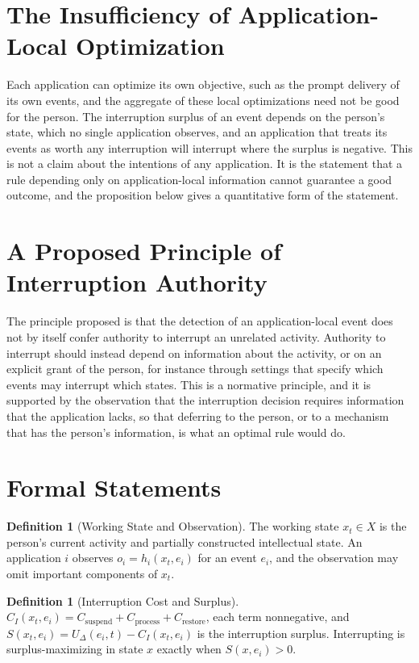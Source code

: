 \documentclass[11pt,letterpaper]{report}
\theoremstyle{plain}
\theoremstyle{definition}
\newtheorem{definition}[theorem]{Definition}
\theoremstyle{remark}
\begin{document}
\section{The Insufficiency of Application-Local Optimization}

Each application can optimize its own objective, such as the prompt delivery of its own events, and the aggregate of these local optimizations need not be good for the person. The interruption surplus of an event depends on the person's state, which no single application observes, and an application that treats its events as worth any interruption will interrupt where the surplus is negative. This is not a claim about the intentions of any application. It is the statement that a rule depending only on application-local information cannot guarantee a good outcome, and the proposition below gives a quantitative form of the statement.

\section{A Proposed Principle of Interruption Authority}

The principle proposed is that the detection of an application-local event does not by itself confer authority to interrupt an unrelated activity. Authority to interrupt should instead depend on information about the activity, or on an explicit grant of the person, for instance through settings that specify which events may interrupt which states. This is a normative principle, and it is supported by the observation that the interruption decision requires information that the application lacks, so that deferring to the person, or to a mechanism that has the person's information, is what an optimal rule would do.

\section{Formal Statements}

\begin{definition}[Working State and Observation]\label{def:workstate}
The working state $x_t\in X$ is the person's current activity and partially constructed intellectual state. An application $i$ observes $o_i=h_i(x_t,e_i)$ for an event $e_i$, and the observation may omit important components of $x_t$.
\end{definition}

\begin{definition}[Interruption Cost and Surplus]\label{def:interruptcost}
$C_I(x_t,e_i)=C_{\mathrm{suspend}}+C_{\mathrm{process}}+C_{\mathrm{restore}}$, each term nonnegative, and $S(x_t,e_i)=U_\Delta(e_i,t)-C_I(x_t,e_i)$ is the interruption surplus. Interrupting is surplus-maximizing in state $x$ exactly when $S(x,e_i)>0$.
\end{definition}
\end{document}

